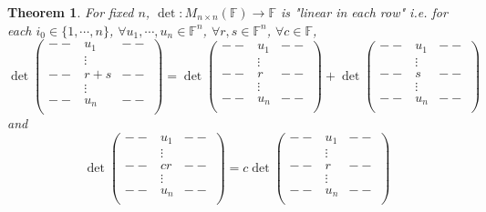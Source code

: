 \documentclass[12pt]{article}
\theoremstyle{plain}
\newtheorem{theorem}{Theorem}[subsection]
\newcommand{\mF}{{\mathbb{F}}}
\begin{document}
\begin{theorem}
	For fixed $n$, $\det: M_{n\times n}(\mF)\to \mF$ is "linear in each row"
	i.e. for each $i_0 \in \{1, \cdots, n\}$, $\forall u_1, \cdots, u_n \in
	\mF^n$, $\forall r, s\in \mF^n$, $\forall c \in \mF$, 
	\[
		\det
		\begin{pmatrix}
			--	& u_1 &	--	\\
				& \vdots &	\\
			--	& r+s &	--	\\
				& \vdots &	\\
			--	& u_n &	--	\\
		\end{pmatrix}
		= 
		\det
		\begin{pmatrix}
			--	& u_1 &	--	\\
				& \vdots &	\\
			--	& r &	--	\\
				& \vdots &	\\
			--	& u_n &	--	\\
		\end{pmatrix}
		+
		\det
		\begin{pmatrix}
			--	& u_1 &	--	\\
				& \vdots &	\\
			--	& s &	--	\\
				& \vdots &	\\
			--	& u_n &	--	\\
		\end{pmatrix}
	\]
	and 
	\[
		\det
		\begin{pmatrix}
			--	& u_1 &	--	\\
				& \vdots &	\\
			--	& cr &	--	\\
				& \vdots &	\\
			--	& u_n &	--	\\
		\end{pmatrix}
		= c
		\det
		\begin{pmatrix}
			--	& u_1 &	--	\\
				& \vdots &	\\
			--	& r &	--	\\
				& \vdots &	\\
			--	& u_n &	--	\\
		\end{pmatrix}
	\]
\end{theorem}
\end{document}

